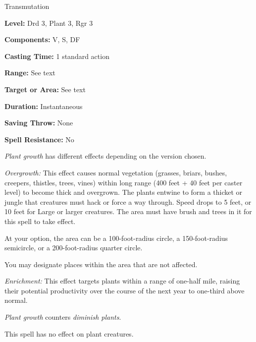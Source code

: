 
Transmutation

\textbf{Level:} Drd 3, Plant 3, Rgr 3

\textbf{Components:} V, S, DF

\textbf{Casting Time:} 1 standard action

\textbf{Range:} See text

\textbf{Target or Area:} See text

\textbf{Duration:} Instantaneous

\textbf{Saving Throw:} None

\textbf{Spell Resistance:} No

\textit{Plant growth} has different effects depending on the version chosen.

\textit{Overgrowth:} This effect causes normal vegetation (grasses, briars, bushes, 
creepers, thistles, trees, vines) within long range (400 feet + 40 feet per caster 
level) to become thick and overgrown. The plants entwine to form a thicket or jungle 
that creatures must hack or force a way through. Speed drops to 5 feet, or 10 feet 
for Large or larger creatures. The area must have brush and trees in it for this 
spell to take effect.

At your option, the area can be a 100-foot-radius circle, a 150-foot-radius semicircle, 
or a 200-foot-radius quarter circle.

You may designate places within the area that are not affected.

\textit{Enrichment:} This effect targets plants within a range of one-half mile, 
raising their potential productivity over the course of the next year to one-third 
above normal.

\textit{Plant growth} counters \textit{diminish plants}.

This spell has no effect on plant creatures.

